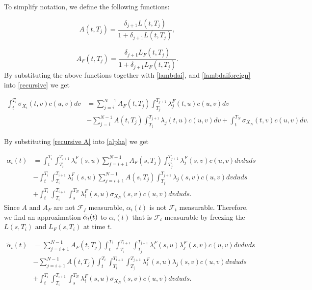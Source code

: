 \documentclass[11pt]{article}
\newcommand{\filt}{\ensuremath{\mathcal{F}}}
\begin{document}
To simplify notation, we define the following functions: 

\begin{equation*}
    A(t,T_j)=\frac{\delta_{j+1}L(t,T_j)}{1+\delta_{j+1}L(t,T_j)},
\end{equation*}

\begin{equation*}
    A_F(t,T_j)=\frac{\delta_{j+1}L_F(t,T_j)}{1+\delta_{j+1}L_F(t,T_j)}.
\end{equation*}
By substituting the above functions together with \eqref{lambdai}, and \eqref{lambdaiforeign} into \eqref{recursive} we get


\begin{equation}\label{recursive A}
\begin{split}
    \int_t^{T_i}\sigma_{X_i}(t,v)c(u,v)dv&=\sum_{j=i}^{N-1}A_F(t,T_j)\int_{T_j}^{T_{j+1}}\lambda_j^F(t,u) c(u,v)dv\\&-\sum_{j=i}^{N-1}A(t,T_j)\int_{T_j}^{T_{j+1}}\lambda_j(t,u) c(u,v)dv+\int_t^{T_{N}}\sigma_{X_{N}}(t,v)c(u,v)dv.
\end{split}
\end{equation}

By substituting \eqref{recursive A} into \eqref{alpha} we get 

\begin{equation}
\begin{split}
        \alpha_i(t)&=\int_t^{T_i}\int_{T_i}^{T_{i+1}}\lambda ^F_i(s,u)\sum_{j=i+1}^{N-1}A_F(s,T_j)\int_{T_j}^{T_{j+1}}\lambda_j^F(s,v) c(u,v)dvduds\\
        &-\int_t^{T_i}\int_{T_i}^{T_{i+1}}\lambda^F _i(s,u)\sum_{j=i+1}^{N-1}A(s,T_j)\int_{T_j}^{T_{j+1}}\lambda_j(s,v) c(u,v)dvduds\\
        &+\int_t^{T_i}\int_{T_i}^{T_{i+1}}\int_s^{T_N}\lambda_i^F(s,u)\sigma_{X_N}(s,v)c(u,v)dvduds.
\end{split}
\end{equation}
Since $A$ and $A_F$ are not $\filt_f$ measurable, $\alpha_i(t)$ is not $\filt_t$ measurable. Therefore, we find an approximation $\Tilde{\alpha}_i(t)$ to $\alpha_i(t)$ that is $\filt_t$ measurable by freezing the $L(s,T_i)$ and $L_F(s,T_i)$ at time $t$.

\begin{equation}\label{alphaapprox}
\begin{split}
        \tilde{\alpha}_i(t)&=\sum_{j=i+1}^{N-1}A_F(t,T_j)\int_t^{T_i}\int_{T_i}^{T_{i+1}}\int_{T_j}^{T_{j+1}}\lambda ^F_i(s,u)\lambda_j^F(s,v) c(u,v)dvduds\\
        &-\sum_{j=i+1}^{N-1}A(t,T_j)\int_t^{T_i}\int_{T_i}^{T_{i+1}}\int_{T_j}^{T_{j+1}}\lambda^F _i(s,u) \lambda_j(s,v) c(u,v)dvduds\\
        &+\int_t^{T_i}\int_{T_i}^{T_{i+1}}\int_s^{T_N}\lambda_i^F(s,u)\sigma_{X_N}(s,v)c(u,v)dvduds.
\end{split}
\end{equation}
\end{document}

